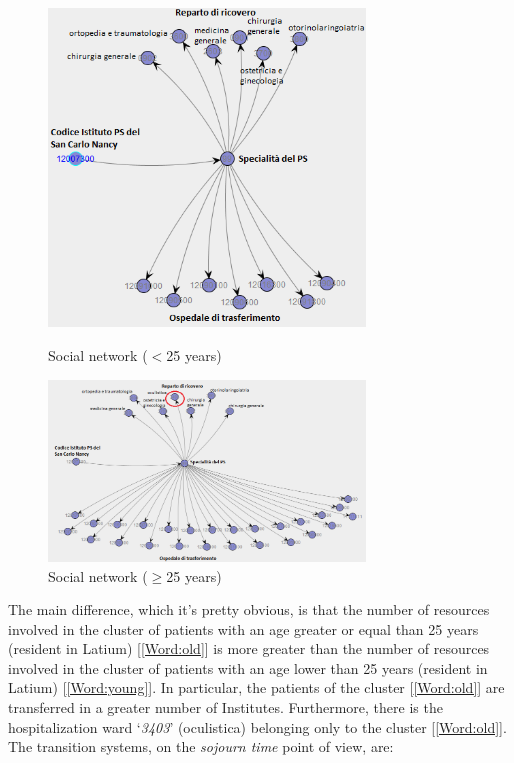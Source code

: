 \begin{figure} [htbp]
\includegraphics[width=0.75\textwidth, keepaspectratio]{ProntoSoccorsoHoWYoungs}
\caption{Social network ($<$25 years)}
\includegraphics[width=0.75\textwidth, keepaspectratio]{ProntoSoccorsoHoWOlds}
\caption{Social network ($\geq$25 years)}
\end{figure}
\noindent
The main difference, which it’s pretty obvious, is that the number of resources involved in the cluster of patients with an age greater or equal than 25 years (resident in Latium) [\ref{Word:old}] is more greater than the number of resources involved in the cluster of patients with an age lower than 25 years (resident in Latium) [\ref{Word:young}]. In particular, the patients of the cluster [\ref{Word:old}] are transferred in a greater number of Institutes. Furthermore, there is the hospitalization ward `\textit{3403}' (oculistica) belonging only to the cluster [\ref{Word:old}]. The transition systems, on the \textit{sojourn time} point of view, are:

